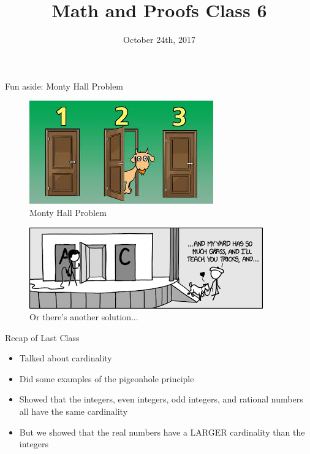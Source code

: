 \documentclass{beamer}
\begin{document}
\title[Math and Proofs]{Math and Proofs Class 6}
\date{October 24th, 2017}

\begin{frame}[plain]
\titlepage
\end{frame}

\begin{frame}{Fun aside: Monty Hall Problem}
\begin{figure}
\includegraphics[scale=0.5]{MontyHall.jpg}
\caption{Monty Hall Problem}
\end{figure}
\end{frame}

\begin{frame}
\begin{figure}
\includegraphics[scale=0.5]{xkcdMontyHall.png}
\caption{Or there's another solution...}
\end{figure}
\end{frame}


\begin{frame}{Recap of Last Class}
\begin{itemize}
\item Talked about cardinality
\item Did some examples of the pigeonhole principle
\item Showed that the integers, even integers, odd integers, and rational numbers all have the same cardinality
\item But we showed that the real numbers have a LARGER cardinality than the integers
\end{itemize}
\end{frame}
\end{document}
